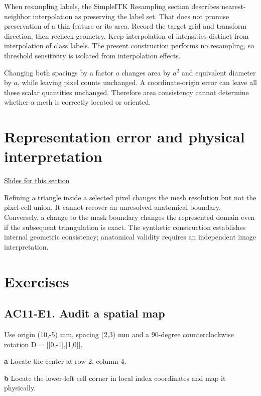 \documentclass[11pt,letterpaper]{article}
\theoremstyle{definition}\newtheorem{definition}{Definition}\newtheorem{example}{Example}
\numberwithin{equation}{section}
\begin{document}
When resampling labels, the SimpleITK Resampling section describes nearest-neighbor interpolation as preserving the label set. That does not promise preservation of a thin feature or its area. Record the target grid and transform direction, then recheck geometry. Keep interpolation of intensities distinct from interpolation of class labels. The present construction performs no resampling, so threshold sensitivity is isolated from interpolation effects.

Changing both spacings by a factor $a$ changes area by $a^2$ and equivalent diameter by $a$, while leaving pixel counts unchanged. A coordinate-origin error can leave all these scalar quantities unchanged. Therefore area consistency cannot determine whether a mesh is correctly located or oriented.
\section{Representation error and physical interpretation}
\hypertarget{note-representation-error-and-physical-interpretation}{}\label{note:representation-error-and-physical-interpretation}
{\small \href{slides.html\#frame=scale-and-location-have-different-signatures\&step=1}{Slides for this section}}\par


Refining a triangle inside a selected pixel changes the mesh resolution but not the pixel-cell union. It cannot recover an unresolved anatomical boundary. Conversely, a change to the mask boundary changes the represented domain even if the subsequent triangulation is exact. The synthetic construction establishes internal geometric consistency; anatomical validity requires an independent image interpretation.
\bigskip
\section*{Exercises}
\par\noindent\begin{minipage}{\linewidth}
\subsection*{AC11-E1. Audit a spatial map}
Use origin (10,-5) mm, spacing (2,3) mm and a 90-degree counterclockwise rotation D =\allowbreak{} [[0,-1],[1,0]].

\textbf{a} Locate the center at row 2, column 4.

\end{minipage}\par\medskip
\textbf{b} Locate the lower-left cell corner in local index coordinates and map it physically.
\end{document}
